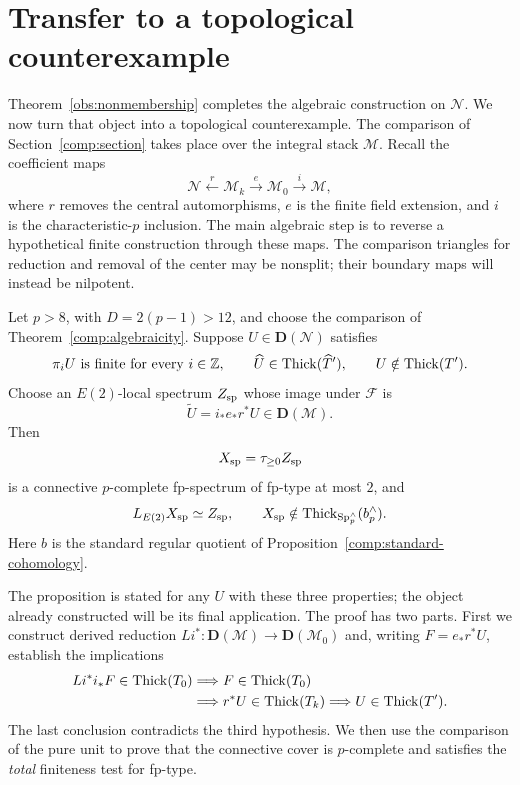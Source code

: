 \section{Transfer to a topological counterexample}
\label{transfer:section}

Theorem~\ref{obs:nonmembership} completes the algebraic construction
on $\mathcal N$. We now turn that object into a topological
counterexample. The comparison of Section~\ref{comp:section} takes
place over the integral stack $\mathcal M$. Recall the coefficient maps
\[
 \mathcal N\xleftarrow{r}\mathcal M_k
       \xrightarrow{e}\mathcal M_0\xrightarrow{i}\mathcal M,
\]
where $r$ removes the central automorphisms, $e$ is the finite field
extension, and $i$ is the characteristic-$p$ inclusion. The main
algebraic step is to reverse a hypothetical finite construction through
these maps. The comparison triangles for reduction and removal of the
center may be nonsplit; their boundary maps will instead be nilpotent.

\begin{proposition}
\label{transfer:criterion}
Let $p>8$, with $D=2(p-1)>12$, and choose the comparison of
Theorem~\ref{comp:algebraicity}. Suppose $U\in\mathbf D(\mathcal N)$ satisfies
\begin{equation}
 \pi_iU\text{ is finite for every }i\in\mathbb Z,\qquad
 \widehat U\in\operatorname{Thick}(\widehat T'),\qquad
 U\notin\operatorname{Thick}(T').
 \label{transfer:conditions}
\end{equation}
Choose an $E(2)$-local spectrum $Z_{\rm sp}$ whose image under
$\mathcal F$ is
\[
 \widetilde U=i_*e_*r^*U\in\mathbf D(\mathcal M).
\]
Then
\[
 X_{\rm sp}=\tau_{\geq0}Z_{\rm sp}
\]
is a connective $p$-complete fp-spectrum of fp-type at most $2$,
and
\[
 L_{E(2)}X_{\rm sp}\simeq Z_{\rm sp},\qquad
 X_{\rm sp}\notin
 \operatorname{Thick}_{\mathrm{Sp}_p^\wedge}(b_p^\wedge).
\]
Here $b$ is the standard regular quotient of
Proposition~\ref{comp:standard-cohomology}.
\end{proposition}

The proposition is stated for any $U$ with these three properties;
the object already constructed will be its final application. The
proof has two parts. First we construct derived reduction
$Li^*:\mathbf D(\mathcal M)\to\mathbf D(\mathcal M_0)$ and,
writing $F=e_*r^*U$, establish the implications
\[
 \begin{split}
 Li^*i_*F\in\operatorname{Thick}(T_0)
 &\Longrightarrow F\in\operatorname{Thick}(T_0)\\
 &\Longrightarrow r^*U\in\operatorname{Thick}(T_k)
 \Longrightarrow U\in\operatorname{Thick}(T').
 \end{split}
\]
The last conclusion contradicts the third hypothesis. We then use the
comparison of the pure unit to prove that the connective cover is
$p$-complete and satisfies the \emph{total} finiteness test for fp-type.

